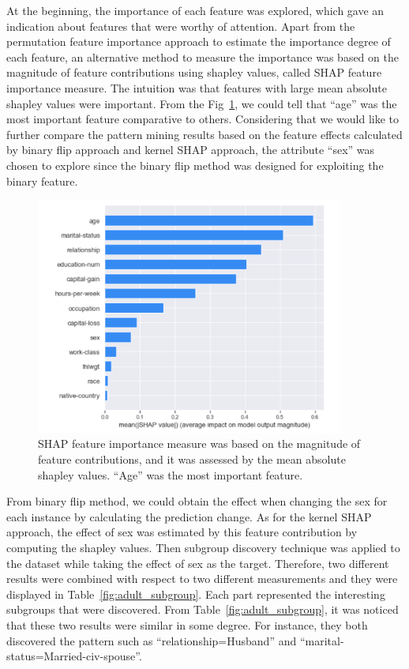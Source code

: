 At the beginning, the importance of each feature was explored, which gave an indication about features that were worthy of attention. Apart from the permutation feature importance approach to estimate the importance degree of each feature, an alternative method to measure the importance was based on the magnitude of feature contributions using shapley values, called SHAP feature importance measure. The intuition was that features with large mean absolute shapley values were important. From the Fig~\ref{fig:adult_bar}, we could tell that “age” was the most important feature comparative to others. Considering that we would like to further compare the pattern mining results based on the feature effects calculated by binary flip approach and kernel SHAP approach, the attribute “sex” was chosen to explore since the binary flip method was designed for exploiting the  binary feature. 

\begin{figure}[H]
	\includegraphics[width=0.9\textwidth]{imgs/adult_bar_plot.png}
	\caption{SHAP feature importance measure was based on the magnitude of feature contributions, and it was assessed by the mean absolute shapley values. “Age” was the most important feature.}
	\label{fig:adult_bar}
\end{figure}

From binary flip method, we could obtain the effect when changing the sex for each instance by calculating the prediction change. As for the kernel SHAP approach, the effect of sex was estimated by this feature contribution by computing the shapley values. Then subgroup discovery technique was applied to the dataset while taking the effect of sex as the target. Therefore, two different results were combined with respect to two different measurements and they were displayed in Table~\ref{fig:adult_subgroup}. Each part represented the interesting subgroups that were discovered. From Table~\ref{fig:adult_subgroup}, it was noticed that these two results were similar in some degree. For instance, they both discovered the pattern such as “relationship=Husband” and “marital-status=Married-civ-spouse”. 

